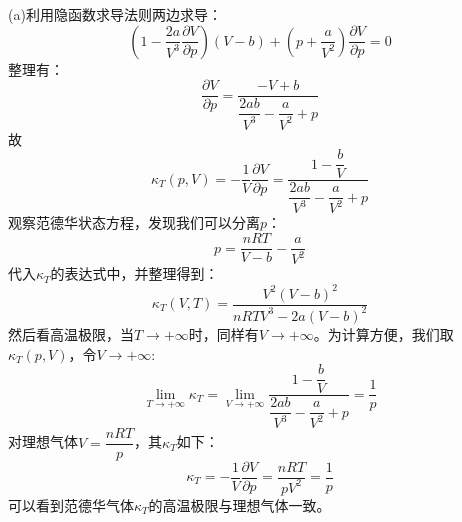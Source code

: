 \begin{solution}
        (a)利用隐函数求导法则两边求导：
        \begin{equation*}
                (1-\frac{2a}{V^{3}}\frac{\partial V}{\partial p})(V-b) + (p+\frac{a}{V^{2}})\frac{\partial V}{\partial p} = 0 
        \end{equation*}
        整理有：
        \begin{equation*}
            \frac{\partial V}{\partial p} = \frac{-V+b}{\dfrac{2ab}{V^{3}}-\dfrac{a}{V^{2}}+p}
        \end{equation*}
        故
        \begin{equation*}
            \kappa_T(p,V) = -\frac{1}{V}\frac{\partial V}{\partial p} = \frac{1-\dfrac{b}{V}}{\dfrac{2ab}{V^{3}}-\dfrac{a}{V^{2}}+p}
        \end{equation*}
        观察范德华状态方程，发现我们可以分离$p$：
        \begin{equation*}
            p = \frac{nRT}{V-b}-\frac{a}{V^{2}}
        \end{equation*}
        代入$\kappa_T$的表达式中，并整理得到：
        \begin{equation*}
            \kappa_T(V,T) = \frac{V^{2}(V-b)^{2}}{nRTV^{3}-2a(V-b)^{2}}
        \end{equation*}
        然后看高温极限，当$T\rightarrow +\infty$时，同样有$V\rightarrow +\infty$。为计算方便，我们取$\kappa_{T}(p,V)$，令$V\rightarrow +\infty$:
        \begin{equation*}
            \lim_{T\rightarrow +\infty}\kappa_T = \lim_{V \rightarrow +\infty}\frac{1-\dfrac{b}{V}}{\dfrac{2ab}{V^{3}}-\dfrac{a}{V^{2}}+p}=\frac{1}{p}
        \end{equation*}
        对理想气体$V = \dfrac{nRT}{p}$，其$\kappa_T$如下：
        \begin{equation*}
            \kappa_T = -\frac{1}{V}\frac{\partial V}{\partial p} = \frac{nRT}{pV^{2}} = \frac{1}{p}
        \end{equation*}
        可以看到范德华气体$\kappa_T$的高温极限与理想气体一致。
        \\
        

\end{solution}
